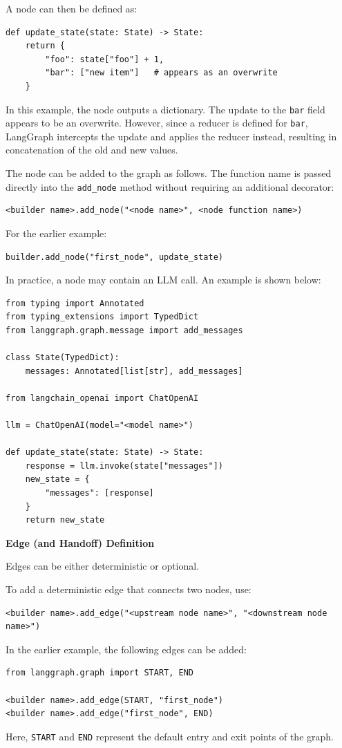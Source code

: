 A node can then be defined as:
\begin{lstlisting}
def update_state(state: State) -> State:
    return {
        "foo": state["foo"] + 1,
        "bar": ["new item"]   # appears as an overwrite
    }
\end{lstlisting}
In this example, the node outputs a dictionary. The update to the \texttt{bar} field appears to be an overwrite. However, since a reducer is defined for \texttt{bar}, LangGraph intercepts the update and applies the reducer instead, resulting in concatenation of the old and new values.

The node can be added to the graph as follows. The function name is passed directly into the \verb|add_node| method without requiring an additional decorator:
\begin{lstlisting}
<builder name>.add_node("<node name>", <node function name>)
\end{lstlisting}
For the earlier example:
\begin{lstlisting}
builder.add_node("first_node", update_state)
\end{lstlisting}

In practice, a node may contain an LLM call. An example is shown below:
\begin{lstlisting}
from typing import Annotated
from typing_extensions import TypedDict
from langgraph.graph.message import add_messages

class State(TypedDict):
    messages: Annotated[list[str], add_messages]
    
from langchain_openai import ChatOpenAI

llm = ChatOpenAI(model="<model name>")

def update_state(state: State) -> State:
    response = llm.invoke(state["messages"])
    new_state = {
        "messages": [response]
    }
    return new_state
\end{lstlisting}

\vspace{0.1in}
\noindent \textbf{Edge (and Handoff) Definition}
\vspace{0.1in}

Edges can be either deterministic or optional. 

To add a deterministic edge that connects two nodes, use:
\begin{lstlisting}
<builder name>.add_edge("<upstream node name>", "<downstream node name>")
\end{lstlisting}

In the earlier example, the following edges can be added:
\begin{lstlisting}
from langgraph.graph import START, END

<builder name>.add_edge(START, "first_node")
<builder name>.add_edge("first_node", END)
\end{lstlisting}
Here, \texttt{START} and \texttt{END} represent the default entry and exit points of the graph.

